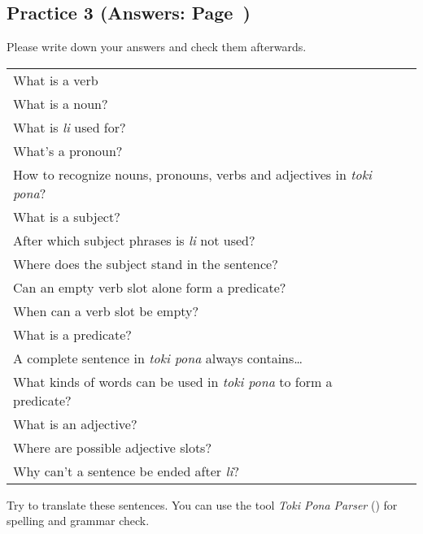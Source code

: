 \subsection*{Practice 3 (Answers: Page~\pageref{'basic_sentences'})}
%

Please write down your answers and check them afterwards. 

\begin{supertabular}{p{5cm}|ll}
What is a verb &&  \\ %
What is a noun? &&   \\ %
What is \textit{li} used for?  &&   \\ %
What's a pronoun?  &&  \\ %
How to recognize nouns, pronouns, verbs and adjectives in \textit{toki pona}? &&  \\ %
What is a subject?  &&   \\ %
After which subject phrases is \textit{li} not used?  &&  \\ %
Where does the subject stand in the sentence?  &&    \\ %
Can an empty verb slot alone form a predicate? &&    \\ %
When can a verb slot be empty?  &&     \\ %
What is a predicate?  &&     \\ %
A complete sentence in \textit{toki pona} always contains\dots  &&     \\ %
What kinds of words can be used in \textit{toki pona} to form a predicate? &&   \\ %
What is an adjective?  &&    \\ %
Where are possible adjective slots?  &&    \\  %
Why can't a sentence be ended after \textit{li}? &&  \\ %
\end{supertabular} 

Try to translate these sentences. 
You can use the tool \textit{Toki Pona Parser} (\cite{www:rowa:02}) for spelling and grammar check. 

